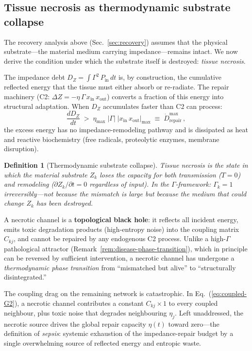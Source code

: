 \documentclass[aps,pre,twocolumn,superscriptaddress,floatfix]{revtex4-2}
\newtheorem{definition}{Definition}
\begin{document}
\subsection{Tissue necrosis as thermodynamic substrate
  collapse}
\label{sec:necrosis}

The recovery analysis above
(Sec.~\ref{sec:recovery}) assumes that the
physical substrate---the material medium carrying
impedance---remains intact.
We now derive the condition under which the
substrate itself is destroyed: \emph{tissue necrosis}.

The impedance debt $D_Z = \int \Gamma^2\,P_{\text{in}}\,dt$
is, by construction, the cumulative reflected energy
that the tissue must either absorb or re-radiate.
The repair machinery (C2: $\Delta Z = -\eta\,\Gamma\,
x_{\text{in}}\,x_{\text{out}}$) converts a fraction
of this energy into structural adaptation.
When $D_Z$ accumulates faster than C2 can process:
\begin{equation}
  \frac{dD_Z}{dt}
  \;>\;
  \eta_{\max}\;|\Gamma|\;|x_{\text{in}}\,x_{\text{out}}|_{\max}
  \;\equiv\; \dot{D}_{\text{repair}}^{\max}\,,
  \label{eq:necrosis-condition}
\end{equation}
the excess energy has no impedance-remodeling
pathway and is dissipated as heat and
reactive biochemistry (free radicals,
proteolytic enzymes, membrane disruption).

\begin{definition}[Thermodynamic substrate collapse]
\label{def:necrosis}
Tissue necrosis is the state in which
the material substrate $Z_k$ loses the
capacity for both transmission ($T = 0$)
and remodeling ($\partial Z_k/\partial t = 0$
regardless of input).
In the $\Gamma$-framework:
$\Gamma_k = 1$ \emph{irreversibly}---not because
the mismatch is large but because the medium that
could change $Z_k$ has been destroyed.
\end{definition}

\noindent
A necrotic channel is a \textbf{topological black hole}:
it reflects all incident energy, emits toxic degradation
products (high-entropy noise) into the coupling matrix
$C_{kj}$, and cannot be repaired by any endogenous C2
process.
Unlike a high-$\Gamma$ pathological attractor
(Remark~\ref{rem:disease-phase-transition}),
which in principle can be reversed by sufficient
intervention, a necrotic channel has undergone a
\emph{thermodynamic phase transition} from
``mismatched but alive'' to
``structurally disintegrated.''

The coupling drag on the remaining network is
catastrophic.
In Eq.~(\ref{eq:coupled-G2}), a necrotic channel
contributes a constant $C_{kj} \times 1$ to every
coupled neighbour, plus toxic noise that degrades
neighbouring $\eta_j$.
Left unaddressed, the necrotic source
drives the global repair capacity $\eta(t)$ toward
zero---the definition of \emph{sepsis}:
systemic exhaustion of the impedance-repair budget
by a single overwhelming source of reflected energy
and entropic waste.
\end{document}

